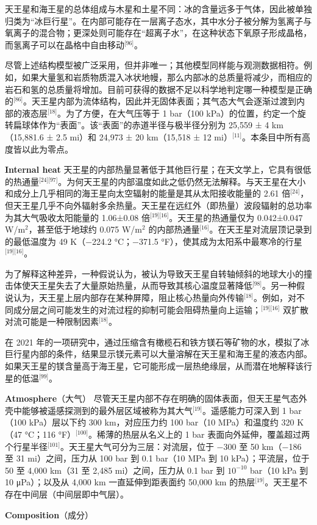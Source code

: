 天王星和海王星的总体组成与木星和土星不同：冰的含量远多于气体，因此被单独归类为“冰巨行星”。在内部可能存在一层离子态水，其中水分子被分解为氢离子与氧离子的混合物；更深处则可能存在“超离子水”，在这种状态下氧原子形成晶格，而氢离子可以在晶格中自由移动\({^\text{[96]}}\)。

尽管上述结构模型被广泛采用，但并非唯一；其他模型同样能与观测数据相符。例如，如果大量氢和岩质物质混入冰状地幔，那么内部冰的总质量将减少，而相应的岩石和氢的总质量将增加。目前可获得的数据不足以科学地判定哪一种模型是正确的\({^\text{[86]}}\)。天王星内部为流体结构，因此并无固体表面；其气态大气会逐渐过渡到内部的液态层\({^\text{[18]}}\)。为了方便，在大气压等于 1 bar（100 kPa）的位置，约定一个旋转扁球体作为“表面”。该“表面”的赤道半径与极半径分别为 25,559 ± 4 km（15,881.6 ± 2.5 mi）和 24,973 ± 20 km（15,518 ± 12 mi）\({^\text{[11]}}\)。本条目中所有高度皆以此为零点。

\textbf{Internal heat} 天王星的内部热量显著低于其他巨行星；在天文学上，它具有很低的热通量\({^\text{[24][97]}}\)。为何天王星的内部温度如此之低仍然无法解释。与天王星在大小和成分上几乎相同的海王星向太空辐射的能量是其从太阳接收能量的 2.61 倍\({^\text{[24]}}\)，但天王星几乎不向外辐射多余热量。天王星在远红外（即热量）波段辐射的总功率为其大气吸收太阳能量的 1.06±0.08 倍\({^\text{[19][16]}}\)。天王星的热通量仅为 0.042±0.047 W/m\(^2\)，甚至低于地球约 0.075 W/m\(^2\) 的内部热通量\({^\text{[16]}}\)。在天王星对流层顶记录到的最低温度为 49 K（−224.2 °C；−371.5 °F），使其成为太阳系中最寒冷的行星\({^\text{[19][16]}}\)。

为了解释这种差异，一种假说认为，被认为导致天王星自转轴倾斜的地球大小的撞击体使天王星失去了大量原始热量，从而导致其核心温度显著降低\({^\text{[98]}}\)。另一种假说认为，天王星上层内部存在某种屏障，阻止核心热量向外传输\({^\text{[18]}}\)。例如，对不同成分层之间可能发生的对流过程的抑制可能会阻碍热量向上运输；\({^\text{[19][16]}}\) 双扩散对流可能是一种限制因素\({^\text{[18]}}\)。

在 2021 年的一项研究中，通过压缩含有橄榄石和铁方镁石等矿物的水，模拟了冰巨行星内部的条件，结果显示镁元素可以大量溶解在天王星和海王星的液态内部。如果天王星的镁含量高于海王星，它可能形成一层热绝缘层，从而潜在地解释该行星的低温\({^\text{[99]}}\)。

\textbf{Atmosphere}（大气） 尽管天王星内部不存在明确的固体表面，但天王星气态外壳中能够被遥感探测到的最外层区域被称为其大气\({^\text{[19]}}\)。遥感能力可深入到 1 bar（100 kPa）层以下约 300 km，对应压力约 100 bar（10 MPa）和温度约 320 K（47 °C；116 °F）\({^\text{[100]}}\)。稀薄的热层从名义上的 1 bar 表面向外延伸，覆盖超过两个行星半径\({^\text{[101]}}\)。天王星大气可分为三层：对流层，位于 −300 至 50 km（−186 至 31 mi）之间，压力从 100 bar 到 0.1 bar（10 MPa 到 10 kPa）；平流层，位于 50 至 4,000 km（31 至 2,485 mi）之间，压力从 0.1 bar 到 \(10^{-10}\) bar（10 kPa 到 10 μPa）；以及从 4,000 km 一直延伸到距表面约 50,000 km 的热层\({^\text{[19]}}\)。天王星不存在中间层（中间层即中气层）。

\textbf{Composition}（成分）




